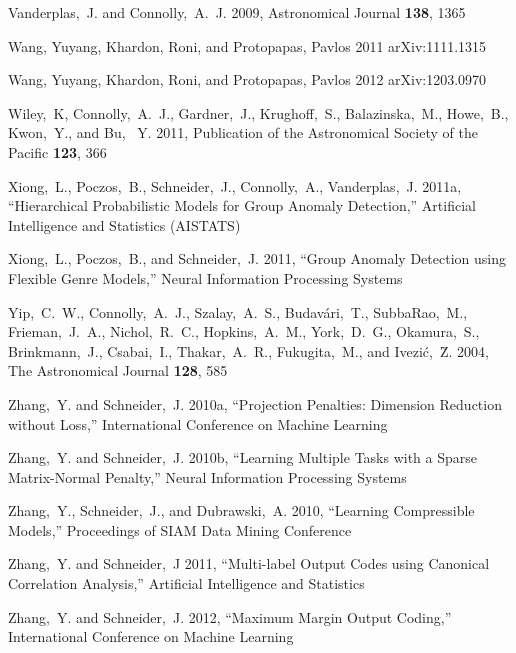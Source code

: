 \documentclass[useAMS,usenatbib,tightenlines,11pt,preprint]{aastex}
\begin{document}
\begin{thebibliography}{99}
Vanderplas,~J. and Connolly,~A.~J. 2009,
Astronomical Journal {\bf 138}, 1365

Wang, Yuyang, Khardon, Roni, and Protopapas, Pavlos 2011
arXiv:1111.1315

Wang, Yuyang, Khardon, Roni, and Protopapas, Pavlos 2012
arXiv:1203.0970

Wiley,~K, Connolly,~A.~J., Gardner,~J., Krughoff,~S., Balazinska,~M., Howe,~B.,
Kwon,~Y., and Bu, ~Y. 2011, Publication of the Astronomical Society of the
Pacific {\bf 123}, 366

Xiong,~L., Poczos,~B., Schneider,~J., Connolly,~A., Vanderplas,~J. 2011a,
``Hierarchical Probabilistic Models for Group Anomaly Detection,''
Artificial Intelligence and Statistics (AISTATS)

Xiong,~L., Poczos,~B., and Schneider,~J. 2011, ``Group Anomaly Detection using Flexible
Genre Models,'' Neural Information Processing Systems

Yip,~C.~W., Connolly,~A.~J., Szalay,~A.~S., Budav\'ari,~T., SubbaRao,~M.,
Frieman,~J.~A., Nichol,~R.~C., Hopkins,~A.~M., York,~D.~G., Okamura,~S.,
Brinkmann,~J., Csabai,~I., Thakar,~A.~R., Fukugita,~M., 
and Ivezi\'c,~\u Z. 2004, The Astronomical Journal {\bf 128}, 585

Zhang,~Y. and Schneider,~J. 2010a, ``Projection Penalties: Dimension Reduction without
Loss,'' International Conference on Machine Learning

Zhang,~Y. and Schneider,~J. 2010b,
``Learning Multiple Tasks with a Sparse Matrix-Normal Penalty,''
Neural Information Processing Systems

Zhang,~Y., Schneider,~J., and Dubrawski,~A. 2010,
``Learning Compressible Models,'' Proceedings of SIAM Data Mining Conference

Zhang,~Y. and Schneider,~J 2011, ``Multi-label Output Codes using Canonical Correlation
Analysis,'' Artificial Intelligence and Statistics

Zhang,~Y. and Schneider,~J. 2012, ``Maximum Margin Output Coding,''
International Conference on Machine Learning

\end{thebibliography} 
\label{lastpage}
\end{document}
